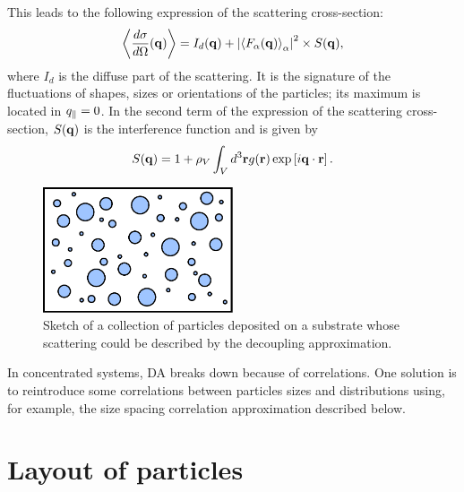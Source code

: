 This leads to the following expression of the scattering cross-section:
\begin{equation*}
\left\langle \frac{d\sigma}{d\Omega}(\mathbf{q}) \right\rangle  = I_d(\mathbf{q}) + \left\lvert \left\langle F_\alpha(\mathbf{q}) \right\rangle_\alpha \right\rvert ^2 \times S(\mathbf{q}),
\end{equation*}
where $I_d$ is the diffuse part of the scattering. It is the signature of the fluctuations of shapes, sizes or orientations of the particles; its maximum is located in $q_{\parallel}=0$. In the second term of the expression of the scattering cross-section, $S(\mathbf{q})$ is the interference function and is given by
\begin{equation*} 
  S(\mathbf{q}) = 1+ \rho_V \int_V d^3\mathbf{r} g(\mathbf{r}) \exp \left[ i\mathbf{q}\cdot \mathbf{r} \right].
\end{equation*}


\begin{figure}[tb]
\begin{center}
\includegraphics[width=0.5\textwidth]{fig/drawing/drawingDA.pdf}
\end{center}
\caption{Sketch of a collection of particles deposited on a substrate whose scattering  could be described by the decoupling approximation.}
\label{fig:da}
\end{figure}


In concentrated systems, DA breaks down because of correlations. One solution is to reintroduce some correlations between particles sizes and distributions using, for example, the size spacing correlation approximation described below. 




\section{Layout of particles}\label{sec:partlayout}

